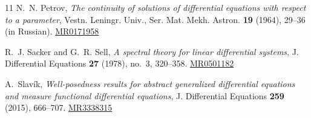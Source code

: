 \documentclass[reqno]{amsart}
\theoremstyle{plain}
\numberwithin{equation}{section}
\numberwithin{definition}{section}
\begin{document}
\begin{thebibliography}{11}
N.~N. Petrov,
\emph{The continuity of solutions of differential equations
with respect to a parameter},
Vestn. Leningr. Univ., Ser. Mat. Mekh. Astron.
\textbf{19} (1964), 29--36 (in Russian). \href{https://mathscinet.ams.org/mathscinet-getitem?mr=171958}{MR0171958}

R.~J. Sacker and G.~R. Sell,
\emph{A spectral theory for linear differential systems},
J. Differential Equations \textbf{27} (1978), no.~3,
320--358.
\href{https://mathscinet.ams.org/mathscinet-getitem?mr=501182}
{MR0501182}

A.~Slav\'ik,
\emph{Well-posedness results for abstract generalized differential
equations and measure functional differential equations},
J. Differential Equations \textbf{259} (2015), 666--707.
\href{https://mathscinet.ams.org/mathscinet-getitem?mr=3338315}
{MR3338315}


\end{thebibliography} 
\end{document}
